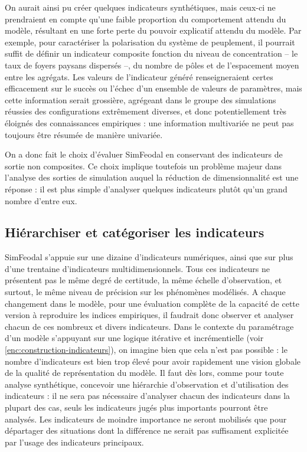 On aurait ainsi pu créer quelques indicateurs synthétiques, mais ceux-ci ne prendraient en compte qu'une faible proportion du comportement attendu du modèle, résultant en une forte perte du pouvoir explicatif attendu du modèle.
Par exemple, pour caractériser la polarisation du système de peuplement, il pourrait suffit de définir un indicateur composite fonction du niveau de concentration -- le taux de foyers paysans dispersés --, du nombre de pôles et de l'espacement moyen entre les agrégats. Les valeurs de l'indicateur généré renseigneraient certes efficacement sur le succès ou l'échec d'un ensemble de valeurs de paramètres, mais cette information serait grossière, agrégeant dans le groupe des \og simulations réussies\fg{} des configurations extrêmement diverses, et donc potentiellement très éloignés des connaissances empiriques : une information multivariée ne peut pas toujours être résumée de manière univariée.

On a donc fait le choix d'évaluer SimFeodal en conservant des indicateurs de sortie non composites. Ce choix implique toutefois un problème majeur dans l'analyse des sorties de simulation auquel la réduction de dimensionnalité est une réponse : il est plus simple d'analyser quelques indicateurs plutôt qu'un grand nombre d'entre eux.
	

\subsection{Hiérarchiser et catégoriser les indicateurs}

SimFeodal s'appuie sur une dizaine d'indicateurs numériques, ainsi que sur plus d'une trentaine d'indicateurs multidimensionnels. Tous ces indicateurs ne présentent pas le même degré de certitude, la même échelle d'observation, et surtout, le même niveau de précision sur les phénomènes modélisés. A chaque changement dans le modèle, pour une évaluation complète de la capacité de cette version à reproduire les indices empiriques, il faudrait donc observer et analyser chacun de ces nombreux et divers indicateurs. Dans le contexte du paramétrage d'un modèle s'appuyant sur une logique itérative et incrémentielle (voir \cref{enc:construction-indicateurs}), on imagine bien que cela n'est pas possible : le nombre d'indicateurs est bien trop élevé pour avoir rapidement une vision globale de la qualité de représentation du modèle. Il faut dès lors, comme pour toute analyse synthétique, concevoir une hiérarchie d'observation et d'utilisation des indicateurs : il ne sera pas nécessaire d'analyser chacun des indicateurs dans la plupart des cas, seuls les indicateurs jugés plus importants pourront être analysés. Les indicateurs de moindre importance ne seront mobilisés que pour départager des situations dont la différence ne serait pas suffisament explicitée par l'usage des indicateurs principaux.

